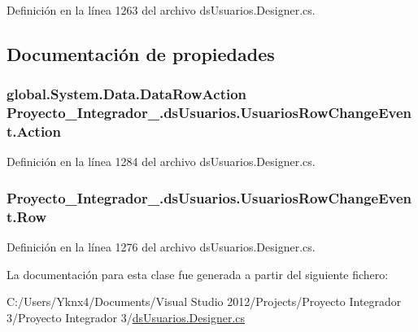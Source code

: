 Definición en la línea 1263 del archivo ds\-Usuarios.\-Designer.\-cs.



\subsection{Documentación de propiedades}
\hypertarget{class_proyecto___integrador__3_1_1ds_usuarios_1_1_usuarios_row_change_event_a999538fbd2ec0d0947e4cf96b2eb55a7}{
\subsubsection[{Action}]{\setlength{\rightskip}{0pt plus 5cm}global.\-System.\-Data.\-Data\-Row\-Action Proyecto\-\_\-\-Integrador\-\_.\-ds\-Usuarios.\-Usuarios\-Row\-Change\-Event.\-Action\hspace{0.3cm}{\ttfamily [get]}}}\label{class_proyecto___integrador__3_1_1ds_usuarios_1_1_usuarios_row_change_event_a999538fbd2ec0d0947e4cf96b2eb55a7}


Definición en la línea 1284 del archivo ds\-Usuarios.\-Designer.\-cs.

\hypertarget{class_proyecto___integrador__3_1_1ds_usuarios_1_1_usuarios_row_change_event_a826214dc22ebf1a596d46c1e6f19848c}{
\subsubsection[{Row}]{ Proyecto\-\_\-\-Integrador\-\_.\-ds\-Usuarios.\-Usuarios\-Row\-Change\-Event.\-Row\hspace{0.3cm}{\ttfamily [get]}}}\label{class_proyecto___integrador__3_1_1ds_usuarios_1_1_usuarios_row_change_event_a826214dc22ebf1a596d46c1e6f19848c}


Definición en la línea 1276 del archivo ds\-Usuarios.\-Designer.\-cs.



La documentación para esta clase fue generada a partir del siguiente fichero\-:\begin{DoxyCompactItemize}
\item 
C\-:/\-Users/\-Yknx4/\-Documents/\-Visual Studio 2012/\-Projects/\-Proyecto Integrador 3/\-Proyecto Integrador 3/\hyperlink{ds_usuarios_8_designer_8cs}{ds\-Usuarios.\-Designer.\-cs}\end{DoxyCompactItemize}
